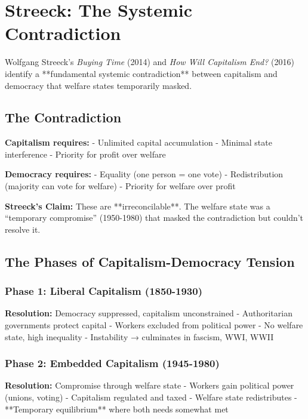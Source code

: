 \section{Streeck: The Systemic Contradiction}
\label{sec:streeck}

Wolfgang Streeck's \emph{Buying Time} (2014) and \emph{How Will Capitalism End?} (2016) identify a **fundamental systemic contradiction** between capitalism and democracy that welfare states temporarily masked.

\subsection{The Contradiction}

\textbf{Capitalism requires:}
- Unlimited capital accumulation
- Minimal state interference
- Priority for profit over welfare

\textbf{Democracy requires:}
- Equality (one person = one vote)
- Redistribution (majority can vote for welfare)
- Priority for welfare over profit

\textbf{Streeck's Claim:} These are **irreconcilable**. The welfare state was a ``temporary compromise'' (1950-1980) that masked the contradiction but couldn't resolve it.

\subsection{The Phases of Capitalism-Democracy Tension}

\subsubsection{Phase 1: Liberal Capitalism (1850-1930)}

\textbf{Resolution:} Democracy suppressed, capitalism unconstrained
- Authoritarian governments protect capital
- Workers excluded from political power
- No welfare state, high inequality
- Instability → culminates in fascism, WWI, WWII

\subsubsection{Phase 2: Embedded Capitalism (1945-1980)}

\textbf{Resolution:} Compromise through welfare state
- Workers gain political power (unions, voting)
- Capitalism regulated and taxed
- Welfare state redistributes
- **Temporary equilibrium** where both needs somewhat met

